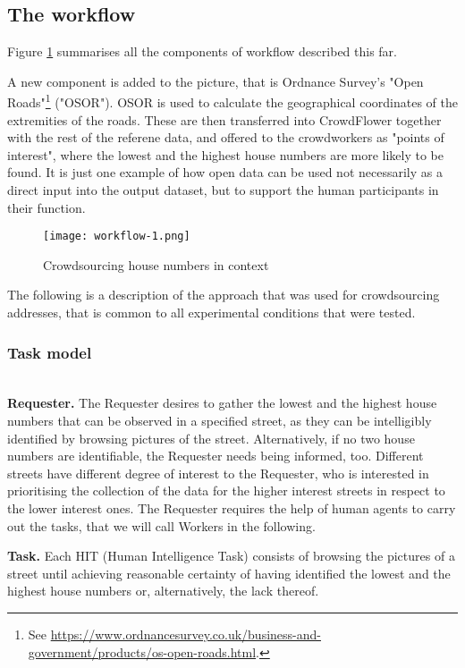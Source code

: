 \subsection{The workflow}

Figure \ref{fig:workflow_1} summarises all the components of workflow described this far.

A new component is added to the picture, that is Ordnance Survey's "Open Roads"\footnote{See \url{https://www.ordnancesurvey.co.uk/business-and-government/products/os-open-roads.html}.} ("OSOR"). OSOR is used to calculate the geographical coordinates of the extremities of the roads. These are then transferred into CrowdFlower together with the rest of the referene data, and offered to the crowdworkers as "points of interest", where the lowest and the highest house numbers are more likely to be found. It is just one example of how open data can be used not necessarily as a direct input into the output dataset, but to support the human participants in their function.

\begin{figure}
	\texttt{[image: workflow-1.png]}
	\caption{Crowdsourcing house numbers in context}
	\label{fig:workflow_1}
\end{figure}

    
The following is a description of the approach that was used for crowdsourcing addresses, that is common to all experimental conditions that were tested.

\subsubsection{Task model} \leavevmode \\ %

\textbf{Requester.} The Requester desires to gather the lowest and the highest house numbers that can be observed in a specified street, as they can be intelligibly identified by browsing pictures of the street. Alternatively, if no two house numbers are identifiable, the Requester needs being informed, too. Different streets have different degree of interest to the Requester, who is interested in prioritising the collection of the data for the higher interest streets in respect to the lower interest ones. The Requester requires the help of human agents to carry out the tasks, that we will call Workers in the following.

\textbf{Task.} Each HIT (Human Intelligence Task) consists of browsing the pictures of a street until achieving reasonable certainty of having identified the lowest and the highest house numbers or, alternatively, the lack thereof.

